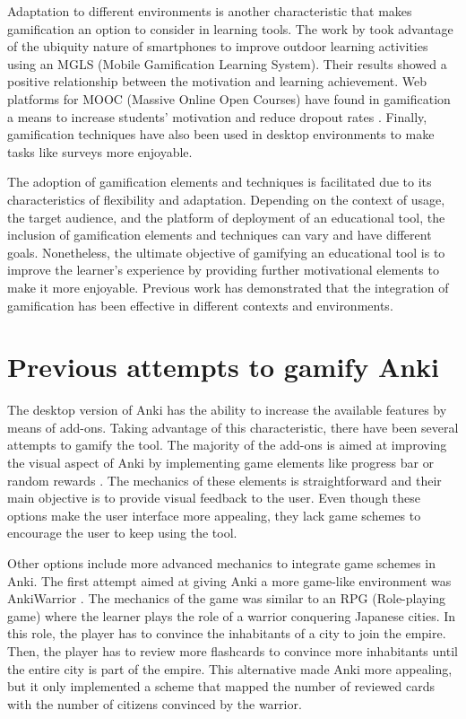 Adaptation to different environments is another characteristic that makes gamification an option to consider in learning tools. The work by \citep{su2015mobile} took advantage of the ubiquity nature of smartphones to improve outdoor learning activities using an MGLS (Mobile Gamification Learning System). Their results showed a positive relationship between the motivation and learning achievement. Web platforms for MOOC (Massive Online Open Courses) have found in gamification a means to increase students' motivation and reduce dropout rates \citep{gene2014gamification}. Finally, gamification techniques have also been used in desktop environments to make tasks like surveys more enjoyable\citep{cheong2013quick}.

The adoption of gamification elements and techniques is facilitated due to its characteristics of flexibility and adaptation. Depending on the context of usage, the target audience, and the platform of deployment of an educational tool, the inclusion of gamification elements and techniques can vary and have different goals. Nonetheless, the ultimate objective of gamifying an educational tool is to improve the learner's experience by providing further motivational elements to make it more enjoyable. Previous work has demonstrated that the integration of gamification has been effective in different contexts and environments.

\section{Previous attempts to gamify Anki}
The desktop version of Anki has the ability to increase the available features by means of add-ons. Taking advantage of this characteristic, there have been several attempts to gamify the tool. The majority of the add-ons is aimed at improving the visual aspect of Anki by implementing game elements like progress bar \citep{glut2017progress} or random rewards \citep{glut2017puppy}. The mechanics of these elements is straightforward and their main objective is to provide visual feedback to the user. Even though these options make the user interface more appealing, they lack game schemes to encourage the user to keep using the tool.

Other options include more advanced mechanics to integrate game schemes in Anki. The first attempt aimed at giving Anki a more game-like environment was AnkiWarrior \citep{proxx2010warrior}. The mechanics of the game was similar to an RPG (Role-playing game) where the learner plays the role of a warrior conquering Japanese cities. In this role, the player has to convince the inhabitants of a city to join the empire. Then, the player has to review more flashcards to convince more inhabitants until the entire city is part of the empire. This alternative made Anki more appealing, but it only implemented a scheme that mapped the number of reviewed cards with the number of citizens convinced by the warrior.

